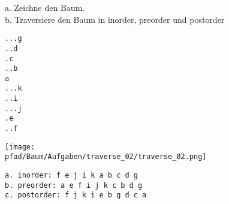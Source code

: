 \question[4]
a. Zeichne den Baum. \\
b. Traversiere den Baum in inorder, preorder und postorder
\begin{lstlisting}
...g
..d
.c
..b
a
...k
..i
...j
.e
..f
\end{lstlisting}

\begin{solutionbox}{6cm}
\texttt{[image: \\pfad/Baum/Aufgaben/traverse\_02/traverse\_02.png]}
\begin{lstlisting}
a. inorder: f e j i k a b c d g
b. preorder: a e f i j k c b d g
c. postorder: f j k i e b g d c a
\end{lstlisting}
\end{solutionbox}
